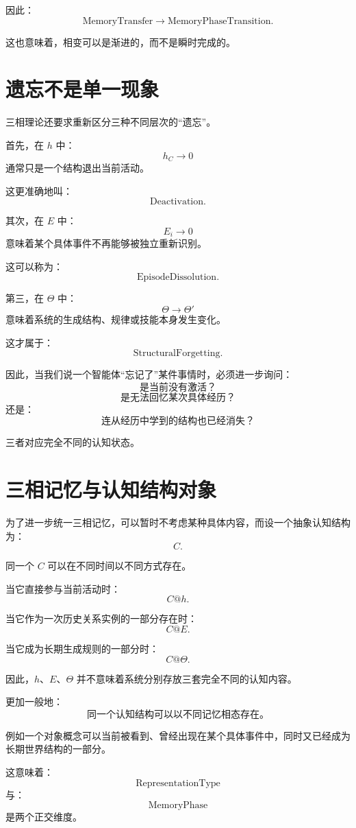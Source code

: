 因此：
\[
\boxed{
\text{MemoryTransfer}
\rightarrow
\text{MemoryPhaseTransition}.
}
\]

这也意味着，相变可以是渐进的，而不是瞬时完成的。

\section{遗忘不是单一现象}

三相理论还要求重新区分三种不同层次的“遗忘”。

首先，在 $h$ 中：
\[
h_C\rightarrow0
\]
通常只是一个结构退出当前活动。

这更准确地叫：
\[
\boxed{
\text{Deactivation}.
}
\]

其次，在 $E$ 中：
\[
E_i\rightarrow0
\]
意味着某个具体事件不再能够被独立重新识别。

这可以称为：
\[
\boxed{
\text{EpisodeDissolution}.
}
\]

第三，在 $\Theta$ 中：
\[
\Theta\rightarrow\Theta'
\]
意味着系统的生成结构、规律或技能本身发生变化。

这才属于：
\[
\boxed{
\text{StructuralForgetting}.
}
\]

因此，当我们说一个智能体“忘记了”某件事情时，必须进一步询问：
\[
\text{是当前没有激活？}
\]
\[
\text{是无法回忆某次具体经历？}
\]
还是：
\[
\text{连从经历中学到的结构也已经消失？}
\]

三者对应完全不同的认知状态。

\section{三相记忆与认知结构对象}

为了进一步统一三相记忆，可以暂时不考虑某种具体内容，而设一个抽象认知结构为：
\[
C.
\]

同一个 $C$ 可以在不同时间以不同方式存在。

当它直接参与当前活动时：
\[
C@h.
\]

当它作为一次历史关系实例的一部分存在时：
\[
C@E.
\]

当它成为长期生成规则的一部分时：
\[
C@\Theta.
\]

因此，$h$、$E$、$\Theta$ 并不意味着系统分别存放三套完全不同的认知内容。

更加一般地：
\[
\boxed{
\text{同一个认知结构可以以不同记忆相态存在。}
}
\]

例如一个对象概念可以当前被看到、曾经出现在某个具体事件中，同时又已经成为长期世界结构的一部分。

这意味着：
\[
\boxed{
\text{RepresentationType}
}
\]
与：
\[
\boxed{
\text{MemoryPhase}
}
\]
是两个正交维度。

